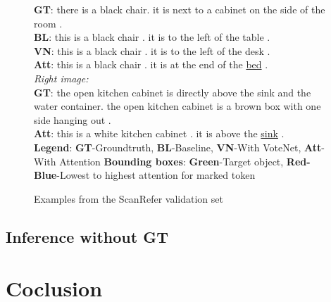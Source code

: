 \documentclass[10pt,twocolumn,letterpaper]{article}
\begin{document}
\begin{figure}
\begin{flushleft}
{			\textbf{GT}: there is a black chair. it is next to a cabinet on the side of the room .\\
			\textbf{BL}: this is a black chair . it is to the left of the table .\\
			\textbf{VN}: this is a black chair . it is to the left of the desk .\\
			\textbf{Att}: this is a black chair . it is at the end of the \underline{bed} .\\
			\textit{Right image:}\\
			\textbf{GT}: the open kitchen cabinet is directly above the sink and the water container. the open kitchen cabinet is a brown box with one side hanging out .\\
			\textbf{Att}: this is a white kitchen cabinet . it is above the \underline{sink} .\\
			\textbf{Legend}: \textbf{GT}-Groundtruth, \textbf{BL}-Baseline, \textbf{VN}-With VoteNet, \textbf{Att}-With Attention \textbf{Bounding boxes}: \textbf{\color{green} Green}-Target object, \textbf{{\color{red}Red}-{\color{blue}Blue}}-Lowest to highest attention for marked token
		}
	\end{flushleft}
	\vspace{-1.\baselineskip}
	\caption{Examples from the ScanRefer validation set}
	\label{fig:examples}
	
\end{figure}


\subsection{Inference without GT}

\section{Coclusion}


{\small


}
\end{document}
